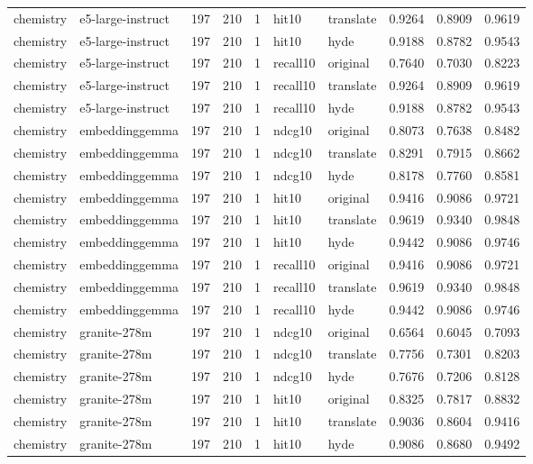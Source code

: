 \begin{tabular}{llrrrllrrr}
chemistry & e5-large-instruct & 197 & 210 & 1 & hit10 & translate & 0.9264 & 0.8909 & 0.9619 \\
chemistry & e5-large-instruct & 197 & 210 & 1 & hit10 & hyde & 0.9188 & 0.8782 & 0.9543 \\
chemistry & e5-large-instruct & 197 & 210 & 1 & recall10 & original & 0.7640 & 0.7030 & 0.8223 \\
chemistry & e5-large-instruct & 197 & 210 & 1 & recall10 & translate & 0.9264 & 0.8909 & 0.9619 \\
chemistry & e5-large-instruct & 197 & 210 & 1 & recall10 & hyde & 0.9188 & 0.8782 & 0.9543 \\
chemistry & embeddinggemma & 197 & 210 & 1 & ndcg10 & original & 0.8073 & 0.7638 & 0.8482 \\
chemistry & embeddinggemma & 197 & 210 & 1 & ndcg10 & translate & 0.8291 & 0.7915 & 0.8662 \\
chemistry & embeddinggemma & 197 & 210 & 1 & ndcg10 & hyde & 0.8178 & 0.7760 & 0.8581 \\
chemistry & embeddinggemma & 197 & 210 & 1 & hit10 & original & 0.9416 & 0.9086 & 0.9721 \\
chemistry & embeddinggemma & 197 & 210 & 1 & hit10 & translate & 0.9619 & 0.9340 & 0.9848 \\
chemistry & embeddinggemma & 197 & 210 & 1 & hit10 & hyde & 0.9442 & 0.9086 & 0.9746 \\
chemistry & embeddinggemma & 197 & 210 & 1 & recall10 & original & 0.9416 & 0.9086 & 0.9721 \\
chemistry & embeddinggemma & 197 & 210 & 1 & recall10 & translate & 0.9619 & 0.9340 & 0.9848 \\
chemistry & embeddinggemma & 197 & 210 & 1 & recall10 & hyde & 0.9442 & 0.9086 & 0.9746 \\
chemistry & granite-278m & 197 & 210 & 1 & ndcg10 & original & 0.6564 & 0.6045 & 0.7093 \\
chemistry & granite-278m & 197 & 210 & 1 & ndcg10 & translate & 0.7756 & 0.7301 & 0.8203 \\
chemistry & granite-278m & 197 & 210 & 1 & ndcg10 & hyde & 0.7676 & 0.7206 & 0.8128 \\
chemistry & granite-278m & 197 & 210 & 1 & hit10 & original & 0.8325 & 0.7817 & 0.8832 \\
chemistry & granite-278m & 197 & 210 & 1 & hit10 & translate & 0.9036 & 0.8604 & 0.9416 \\
chemistry & granite-278m & 197 & 210 & 1 & hit10 & hyde & 0.9086 & 0.8680 & 0.9492 \\

\end{tabular}
